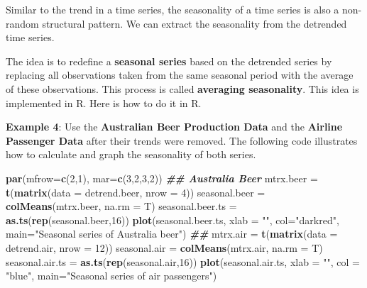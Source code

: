 \documentclass[
]{book}
\newenvironment{Shaded}{\begin{snugshade}}{\end{snugshade}}
\newcommand{\AttributeTok}[1]{\textcolor[rgb]{0.13,0.29,0.53}{#1}}
\newcommand{\DecValTok}[1]{\textcolor[rgb]{0.00,0.00,0.81}{#1}}
\newcommand{\DocumentationTok}[1]{\textcolor[rgb]{0.56,0.35,0.01}{\textbf{\textit{#1}}}}
\newcommand{\FunctionTok}[1]{\textcolor[rgb]{0.13,0.29,0.53}{\textbf{#1}}}
\newcommand{\NormalTok}[1]{#1}
\newcommand{\OtherTok}[1]{\textcolor[rgb]{0.56,0.35,0.01}{#1}}
\newcommand{\StringTok}[1]{\textcolor[rgb]{0.31,0.60,0.02}{#1}}
\begin{document}
Similar to the trend in a time series, the seasonality of a time series is also a non-random structural pattern. We can extract the seasonality from the detrended time series.

The idea is to redefine a \textbf{seasonal series} based on the detrended series by replacing all observations taken from the same seasonal period with the average of these observations. This process is called \textbf{averaging seasonality}. This idea is implemented in R. Here is how to do it in R.

\textbf{Example 4}: Use the \textbf{Australian Beer Production Data} and the \textbf{Airline Passenger Data} after their trends were removed. The following code illustrates how to calculate and graph the seasonality of both series.

\begin{Shaded}
\begin{Highlighting}[]
\FunctionTok{par}\NormalTok{(}\AttributeTok{mfrow=}\FunctionTok{c}\NormalTok{(}\DecValTok{2}\NormalTok{,}\DecValTok{1}\NormalTok{), }\AttributeTok{mar=}\FunctionTok{c}\NormalTok{(}\DecValTok{3}\NormalTok{,}\DecValTok{2}\NormalTok{,}\DecValTok{3}\NormalTok{,}\DecValTok{2}\NormalTok{))}
\DocumentationTok{\#\# Australia Beer}
\NormalTok{mtrx.beer }\OtherTok{=} \FunctionTok{t}\NormalTok{(}\FunctionTok{matrix}\NormalTok{(}\AttributeTok{data =}\NormalTok{ detrend.beer, }\AttributeTok{nrow =} \DecValTok{4}\NormalTok{))}
\NormalTok{seasonal.beer }\OtherTok{=} \FunctionTok{colMeans}\NormalTok{(mtrx.beer, }\AttributeTok{na.rm =}\NormalTok{ T)}
\NormalTok{seasonal.beer.ts }\OtherTok{=} \FunctionTok{as.ts}\NormalTok{(}\FunctionTok{rep}\NormalTok{(seasonal.beer,}\DecValTok{16}\NormalTok{))}
\FunctionTok{plot}\NormalTok{(seasonal.beer.ts, }\AttributeTok{xlab =} \StringTok{""}\NormalTok{, }\AttributeTok{col=}\StringTok{"darkred"}\NormalTok{, }\AttributeTok{main=}\StringTok{"Seasonal series of Australia beer"}\NormalTok{)}
\DocumentationTok{\#\#}
\NormalTok{mtrx.air }\OtherTok{=} \FunctionTok{t}\NormalTok{(}\FunctionTok{matrix}\NormalTok{(}\AttributeTok{data =}\NormalTok{ detrend.air, }\AttributeTok{nrow =} \DecValTok{12}\NormalTok{))}
\NormalTok{seasonal.air }\OtherTok{=} \FunctionTok{colMeans}\NormalTok{(mtrx.air, }\AttributeTok{na.rm =}\NormalTok{ T)}
\NormalTok{seasonal.air.ts }\OtherTok{=} \FunctionTok{as.ts}\NormalTok{(}\FunctionTok{rep}\NormalTok{(seasonal.air,}\DecValTok{16}\NormalTok{))}
\FunctionTok{plot}\NormalTok{(seasonal.air.ts, }\AttributeTok{xlab =} \StringTok{""}\NormalTok{, }\AttributeTok{col =} \StringTok{"blue"}\NormalTok{, }\AttributeTok{main=}\StringTok{"Seasonal series of air passengers"}\NormalTok{)}
\end{Highlighting}
\end{Shaded}
\end{document}

